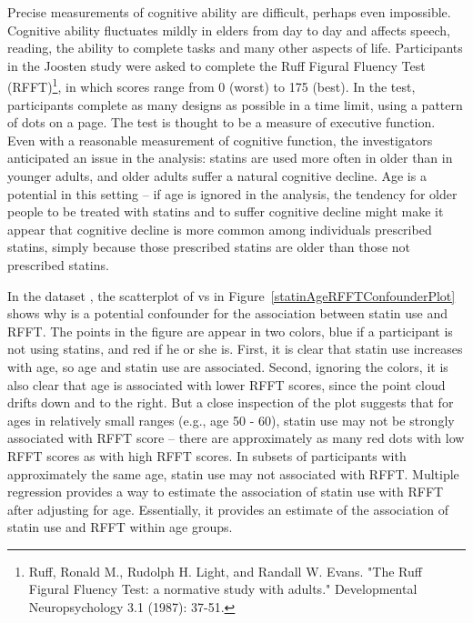  
Precise measurements of cognitive ability are difficult, perhaps even impossible.  Cognitive ability fluctuates mildly in elders from day to day and affects speech, reading, the ability to complete tasks and many other aspects of life.  Participants in the Joosten study were asked to complete the Ruff Figural Fluency Test (RFFT)\footnote{Ruff, Ronald M., Rudolph H. Light, and Randall W. Evans. "The Ruff Figural Fluency Test: a normative study with adults." Developmental Neuropsychology 3.1 (1987): 37-51.}, in which scores range from 0 (worst) to 175 (best).  In the test, participants complete as many designs as possible in a time limit, using a pattern of dots on a page.  The test is thought to be a measure of executive function.  Even with a reasonable measurement of cognitive function, the investigators anticipated an issue in the analysis: statins are used more often in older than in younger adults, and older adults suffer a natural cognitive decline.  Age is a potential  in this setting -- if age is ignored in the analysis, the tendency for older people to be treated with statins and to suffer cognitive decline might make it appear that cognitive decline is more common among individuals prescribed statins, simply because those prescribed statins are older than those not prescribed statins.

In the dataset , the scatterplot of  vs  in Figure~\ref{statinAgeRFFTConfounderPlot} shows why  is a potential confounder for the association between statin use and RFFT.  The points in the figure are appear in two colors, blue if a participant is not using statins, and red if he or she is.  First, it is clear that statin use increases with age, so age and statin use are associated.  Second, ignoring the colors, it is also clear that age is associated with lower RFFT scores, since the point cloud drifts down and to the right.  But a close inspection of the plot suggests that for ages in relatively small ranges (e.g., age 50 - 60), statin use may not be strongly associated with RFFT score -- there are approximately as many red dots with low RFFT scores as with high RFFT scores.  In subsets of participants with approximately the same age, statin use may not associated with RFFT. Multiple regression provides a way to estimate the association of statin use with RFFT after adjusting for age.  Essentially, it provides an estimate of the association of statin use and RFFT within age groups.

